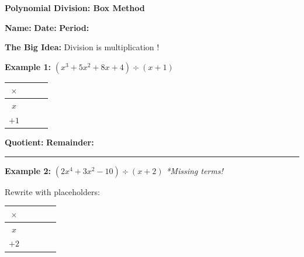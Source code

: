 \documentclass[14pt]{extarticle}
\begin{document}
\begin{center}
    \LARGE\textbf{Polynomial Division: Box Method}
\end{center}
\textbf{Name:} \underline{\hspace{2in}} \hfill \textbf{Date:} \underline{\hspace{1in}} \hfill \textbf{Period:} \underline{\hspace{0.5in}}

\vspace{0.15cm}

\begin{tcolorbox}[colback=gray!15, colframe=black, boxrule=0.5pt, arc=3pt]
\textbf{The Big Idea:} Division is multiplication \underline{\hspace{1.5in}}!
\end{tcolorbox}

\vspace{0.2cm}

\textbf{Example 1:} \quad $(x^3 + 5x^2 + 8x + 4) \div (x + 1)$

\vspace{0.2cm}
\begin{center}
\renewcommand{\arraystretch}{2.5}
\large
\begin{tabular}{|c||p{0.8in}|p{0.8in}|p{0.8in}|}
\hline
$\times$ & & & \\
\hline\hline
$x$ & & & \\
\hline
$+1$ & & & \\
\hline
\end{tabular}
\end{center}

\vspace{0.1cm}
\textbf{Quotient:} \underline{\hspace{2in}} \hfill \textbf{Remainder:} \underline{\hspace{1.2in}}

\vspace{0.25cm}
\hrule
\vspace{0.3cm}

\textbf{Example 2:} \quad $(2x^4 + 3x^2 - 10) \div (x + 2)$ \hfill \textit{*Missing terms!}

\vspace{0.15cm}
Rewrite with placeholders: \underline{\hspace{3.5in}}

\vspace{0.2cm}
\begin{center}
\renewcommand{\arraystretch}{2.3}
\large
\begin{tabular}{|c||p{0.6in}|p{0.6in}|p{0.6in}|p{0.6in}|}
\hline
$\times$ & & & & \\
\hline\hline
$x$ & & & & \\
\hline
$+2$ & & & & \\
\hline
\end{tabular}
\end{center}
\end{document}
